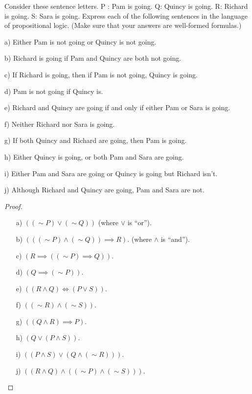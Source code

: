 \documentclass{article}
\begin{document}
\newpage

\begin{ques}\label{q10}
Consider these sentence letters. P : Pam is going. Q: Quincy
is going. R: Richard is going. S: Sara is going. Express each of the following
sentences in the language of propositional logic. (Make sure that your answers
are well-formed formulas.)

a) Either Pam is not going or Quincy is not going.

b) Richard is going if Pam and Quincy are both not going.

c) If Richard is going, then if Pam is not going, Quincy is going.

d) Pam is not going if Quincy is.

e) Richard and Quincy are going if and only if either Pam or Sara is going.

f) Neither Richard nor Sara is going.

g) If both Quincy and Richard are going, then Pam is going.

h) Either Quincy is going, or both Pam and Sara are going.

i) Either Pam and Sara are going or Quincy is going but Richard isn’t.

j) Although Richard and Quincy are going, Pam and Sara are not.
\end{ques}

\begin{proof}

    \hfil

    \begin{itemize}
        \item[a)] $((\sim P) \vee (\sim Q))$ (where $\vee$ is ``or'').
        \item[b)] $(((\sim P) \wedge (\sim Q))\implies R)$. (where $\wedge$ is ``and'').
        \item[c)] $(R \implies ((\sim P) \implies Q))$.
        \item[d)] $(Q \implies (\sim P))$.
        \item[e)] $((R \wedge Q)\iff (P \vee S))$.
        \item[f)] $((\sim R) \wedge (\sim S))$.
        \item[g)] $((Q \wedge R)\implies P)$.
        \item[h)] $(Q \vee (P \wedge S))$.
        \item[i)] $((P \wedge S) \vee (Q \wedge (\sim R)))$.
        \item[j)] $((R \wedge Q) \wedge ((\sim P) \wedge (\sim S)))$.
    \end{itemize}
\end{proof}
\end{document}
